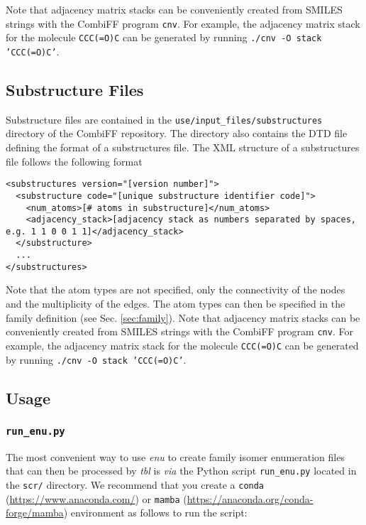 \documentclass[a4paper,11pt]{article}
\begin{document}
Note that adjacency matrix stacks can be conveniently created from SMILES strings with the CombiFF program \texttt{cnv}. For example, the adjacency matrix stack for the molecule \texttt{CCC(=O)C} can be generated by running \texttt{./cnv -O stack 'CCC(=O)C'}.

\subsection{Substructure Files}\label{sec:substructures}

Substructure files are contained in the \texttt{use/input\_files/substructures} directory of the CombiFF repository. The directory also contains the DTD file defining the format of a substructures file. The XML structure of a substructures file follows the following format

\begin{lstlisting}
<substructures version="[version number]">
  <substructure code="[unique substructure identifier code]">
    <num_atoms>[# atoms in substructure]</num_atoms>
    <adjacency_stack>[adjacency stack as numbers separated by spaces, e.g. 1 1 0 0 1 1]</adjacency_stack>
  </substructure>
  ...
</substructures>
\end{lstlisting}

Note that the atom types are not specified, only the connectivity of the nodes and the multiplicity of the edges. The atom types can then be specified in the family definition (see Sec. \ref{sec:family}). Note that adjacency matrix stacks can be conveniently created from SMILES strings with the CombiFF program \texttt{cnv}. For example, the adjacency matrix stack for the molecule \texttt{CCC(=O)C} can be generated by running \texttt{./cnv -O stack 'CCC(=O)C'}.

\subsection{Usage}

\subsubsection{\texttt{run\_enu.py}}

The most convenient way to use \textit{enu} to create family isomer enumeration files that can then be processed by \textit{tbl} is \textit{via} the Python script \texttt{run\_enu.py} located in the \texttt{scr/} directory. We recommend that you create a \texttt{conda} (\url{https://www.anaconda.com/}) or \texttt{mamba} (\url{https://anaconda.org/conda-forge/mamba}) environment as follows to run the script:
\end{document}
